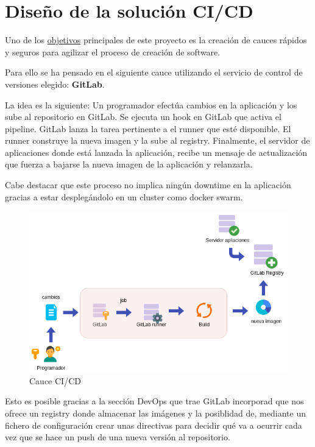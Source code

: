 \section{Diseño de la solución CI/CD}
\begin{text}
	Uno de los \hyperref[objetivos_primarios]{objetivos} principales de este proyecto es la creación de cauces rápidos y seguros para agilizar el proceso de creación de software.
	
	Para ello se ha pensado en el siguiente cauce utilizando el servicio de control de versiones elegido: \textbf{GitLab}.
	
	La idea es la siguiente:
		Un programador efectúa cambios en la aplicación y los sube al repositorio en GitLab. Se ejecuta un hook en GitLab que activa el pipeline. GitLab lanza la tarea pertinente a el runner que esté disponible. El runner construye la nueva imagen y la sube al registry. Finalmente, el servidor de aplicaciones donde está lanzada la aplicación, recibe un mensaje de actualización que fuerza a bajarse la nueva imagen de la aplicación y relanzarla.
	
	Cabe destacar que este proceso no implica ningún downtime en la aplicación gracias a estar desplegándolo en un cluster como docker swarm.
	\clearpage
	\begin{figure}[!hbt]
		\label{cauce_cicd}
		\centering
		\includegraphics[scale=0.55]{imagenes/Diseno/diagrama-cicd.png}
		\caption[Cauce CI/CD]{Cauce CI/CD}
	\end{figure}
	
	Esto es posible gracias a la sección DevOps que trae GitLab incorporad que nos ofrece un registry donde almacenar las imágenes y la posiblidad de, mediante un fichero de configuración crear unas directivas para decidir qué va a ocurrir cada vez que se hace un push de una nueva versión al repositorio.
\end{text}



